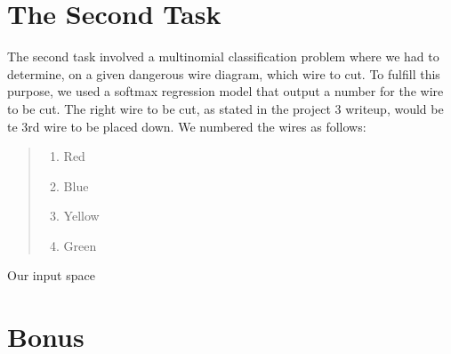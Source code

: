 \documentclass{article}
\begin{document}
\section*{The Second Task}
The second task involved a multinomial classification problem where we had to determine, on a given dangerous wire diagram, which wire to cut.
To fulfill this purpose, we used a softmax regression model that output a number for the wire to be cut. The right wire to be cut, as stated in the project 3 writeup, would be te 3rd wire to be placed down.\newline
\newline
We numbered the wires as follows:
\begin{quote}
    \begin{enumerate}
    \item Red
    \item Blue
    \item Yellow
    \item Green
    \end{enumerate}
    \end{quote}

Our input space 

\section*{Bonus}
\end{document}
